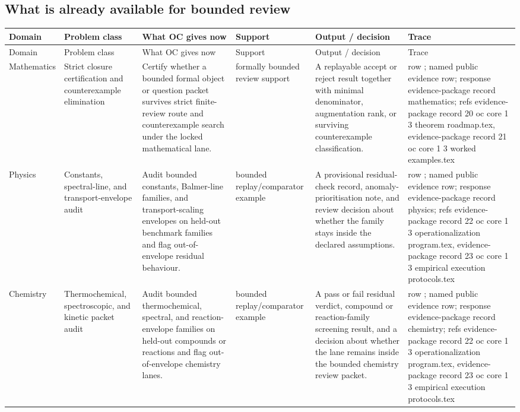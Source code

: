 \subsection{What is already available for bounded review}
\begingroup
\scriptsize
\setlength{\emergencystretch}{1.5em}
\setlength{\tabcolsep}{2pt}
\setlength{\LTleft}{0pt}
\setlength{\LTright}{0pt}
\begin{longtable}{@{}L{0.11\textwidth}L{0.16\textwidth}L{0.19\textwidth}L{0.12\textwidth}L{0.18\textwidth}L{0.16\textwidth}@{}}
\toprule
Domain & Problem class & What OC gives now & Support & Output / decision & Trace \\
\midrule
\endfirsthead
\toprule
Domain & Problem class & What OC gives now & Support & Output / decision & Trace \\
\midrule
\endhead
Mathematics & Strict closure certification and counterexample elimination & Certify whether a bounded formal object or question packet survives strict finite-review route and counterexample search under the locked mathematical lane. & formally bounded review support & A replayable accept or reject result together with minimal denominator, augmentation rank, or surviving counterexample classification. & row ; named public evidence row; \allowbreak response evidence-package record mathematics; \allowbreak refs evidence-package record 20 oc core 1 3 theorem roadmap.tex, \allowbreak evidence-package record 21 oc core 1 3 worked examples.tex \\
Physics & Constants, spectral-line, and transport-envelope audit & Audit bounded constants, Balmer-line families, and transport-scaling envelopes on held-out benchmark families and flag out-of-envelope residual behaviour. & bounded replay/comparator example & A provisional residual-check record, anomaly-prioritisation note, and review decision about whether the family stays inside the declared assumptions. & row ; named public evidence row; \allowbreak response evidence-package record physics; \allowbreak refs evidence-package record 22 oc core 1 3 operationalization program.tex, \allowbreak evidence-package record 23 oc core 1 3 empirical execution protocols.tex \\
Chemistry & Thermochemical, spectroscopic, and kinetic packet audit & Audit bounded thermochemical, spectral, and reaction-envelope families on held-out compounds or reactions and flag out-of-envelope chemistry lanes. & bounded replay/comparator example & A pass or fail residual verdict, compound or reaction-family screening result, and a decision about whether the lane remains inside the bounded chemistry review packet. & row ; named public evidence row; \allowbreak response evidence-package record chemistry; \allowbreak refs evidence-package record 22 oc core 1 3 operationalization program.tex, \allowbreak evidence-package record 23 oc core 1 3 empirical execution protocols.tex \\

\end{longtable}
